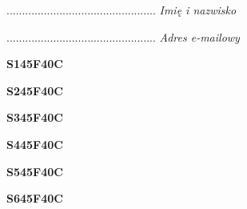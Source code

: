 \begin{turn}{90}\begin{minipage}{\linewidth} \vspace{20mm} ................................................  \textit{Imię i nazwisko}\end{minipage}\end{turn}

\begin{turn}{90}\begin{minipage}{\linewidth} \vspace{20mm} ................................................  \textit{Adres e-mailowy}\end{minipage}\end{turn}

\begin{turn}{90}\huge \begin{minipage}{\linewidth} \vspace{10mm}\textbf{S145F40C}\end{minipage}\end{turn}

\begin{turn}{90}\huge \begin{minipage}{\linewidth} \vspace{10mm}\textbf{S245F40C}\end{minipage}\end{turn}

\begin{turn}{90}\huge \begin{minipage}{\linewidth} \vspace{10mm}\textbf{S345F40C}\end{minipage}\end{turn}

\begin{turn}{90}\huge \begin{minipage}{\linewidth} \vspace{10mm}\textbf{S445F40C}\end{minipage}\end{turn}

\begin{turn}{90}\huge \begin{minipage}{\linewidth} \vspace{10mm}\textbf{S545F40C}\end{minipage}\end{turn}

\begin{turn}{90}\huge \begin{minipage}{\linewidth} \vspace{10mm}\textbf{S645F40C}\end{minipage}\end{turn}

